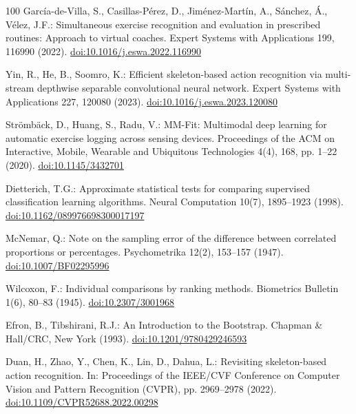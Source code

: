 \documentclass[preprint,12pt]{elsarticle}
\begin{document}
\begin{thebibliography}{100}
Garc\'{i}a-de-Villa, S., Casillas-P\'{e}rez, D., Jim\'{e}nez-Mart\'{i}n, A., S\'{a}nchez, \'{A}., V\'{e}lez, J.F.: Simultaneous exercise recognition and evaluation in prescribed routines: Approach to virtual coaches. Expert Systems with Applications 199, 116990 (2022). \href{https://doi.org/10.1016/j.eswa.2022.116990}{doi:10.1016/j.eswa.2022.116990}

Yin, R., He, B., Soomro, K.: Efficient skeleton-based action recognition via multi-stream depthwise separable convolutional neural network. Expert Systems with Applications 227, 120080 (2023). \href{https://doi.org/10.1016/j.eswa.2023.120080}{doi:10.1016/j.eswa.2023.120080}

Str\"{o}mb\"{a}ck, D., Huang, S., Radu, V.: MM-Fit: Multimodal deep learning for automatic exercise logging across sensing devices. Proceedings of the ACM on Interactive, Mobile, Wearable and Ubiquitous Technologies 4(4), 168, pp. 1--22 (2020). \href{https://doi.org/10.1145/3432701}{doi:10.1145/3432701}

Dietterich, T.G.: Approximate statistical tests for comparing supervised classification learning algorithms. Neural Computation 10(7), 1895--1923 (1998). \href{https://doi.org/10.1162/089976698300017197}{doi:10.1162/089976698300017197}

McNemar, Q.: Note on the sampling error of the difference between correlated proportions or percentages. Psychometrika 12(2), 153--157 (1947). \href{https://doi.org/10.1007/BF02295996}{doi:10.1007/BF02295996}

Wilcoxon, F.: Individual comparisons by ranking methods. Biometrics Bulletin 1(6), 80--83 (1945). \href{https://doi.org/10.2307/3001968}{doi:10.2307/3001968}

Efron, B., Tibshirani, R.J.: An Introduction to the Bootstrap. Chapman \& Hall/CRC, New York (1993). \href{https://doi.org/10.1201/9780429246593}{doi:10.1201/9780429246593}

Duan, H., Zhao, Y., Chen, K., Lin, D., Dahua, L.: Revisiting skeleton-based action recognition. In: Proceedings of the IEEE/CVF Conference on Computer Vision and Pattern Recognition (CVPR), pp. 2969--2978 (2022). \href{https://doi.org/10.1109/CVPR52688.2022.00298}{doi:10.1109/CVPR52688.2022.00298}

\end{thebibliography}
\end{document}
